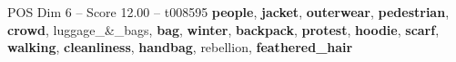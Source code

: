\begin{textsample}{POS Dim 6 – Score 12.00 – t008595}  \label{ex:f6_pos_029}
\textbf{people}, \textbf{jacket}, \textbf{outerwear}, \textbf{pedestrian}, \textbf{crowd}, luggage\_\&\_bags, \textbf{bag}, \textbf{winter}, \textbf{backpack}, \textbf{protest}, \textbf{hoodie}, \textbf{scarf}, \textbf{walking}, \textbf{cleanliness}, \textbf{handbag}, rebellion, \textbf{feathered\_hair}

\end{textsample}
